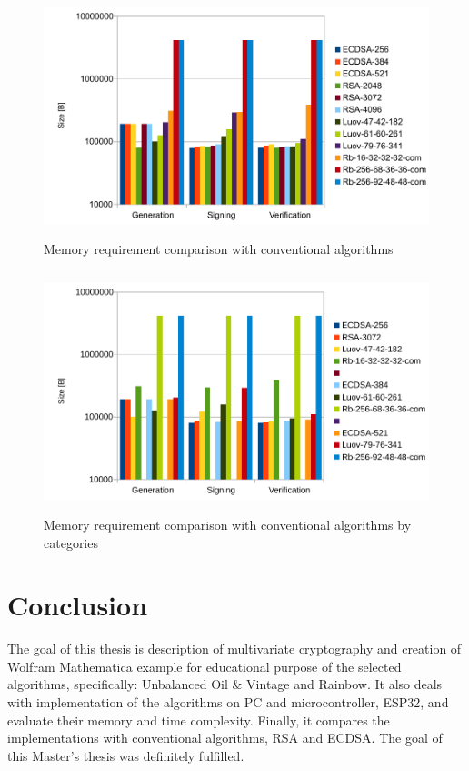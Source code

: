 \documentclass[thesis=M,english]{FITthesis}[2019/12/23]
\begin{document}
\begin{figure}[H]
\centering
\includegraphics[width=13cm,height=7cm]{images/mem-all.pdf}
\caption{Memory requirement comparison with conventional algorithms}
\label{mem-all}
\end{figure}

\bigskip\bigskip\bigskip
\begin{figure}[H]
\centering
\includegraphics[width=13cm,height=7cm]{images/mem-category-all.pdf}
\caption{Memory requirement comparison with conventional algorithms by categories}
\label{mem-category-all}
\end{figure}

\chapter{Conclusion}
The goal of this thesis is description of multivariate cryptography and creation of Wolfram Mathematica example for educational purpose of the selected algorithms, specifically: Unbalanced Oil \& Vintage and Rainbow. It also deals with implementation of the algorithms on PC and microcontroller, ESP32, and evaluate their memory and time complexity. Finally, it compares the implementations with conventional algorithms, RSA and ECDSA. The goal of this Master's thesis was definitely fulfilled.
\end{document}
